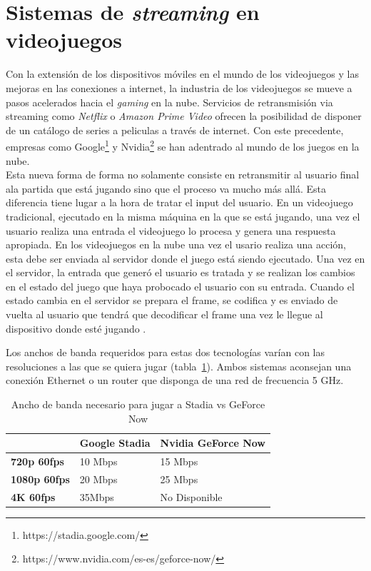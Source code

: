\section{Sistemas de \textit{streaming} en videojuegos}

Con la extensi\'on de los dispositivos m\'oviles en el mundo de los videojuegos y las mejoras en las conexiones a internet, la industria de los videojuegos se mueve a pasos acelerados hacia el \textit{gaming} en la nube. Servicios de retransmisi\'on via streaming como \textit{Netflix} o \textit{Amazon Prime Video} ofrecen la posibilidad de disponer de un cat\'alogo de series a peliculas a trav\'es de internet. Con este precedente, empresas como Google\footnote{https://stadia.google.com/} y Nvidia\footnote{https://www.nvidia.com/es-es/geforce-now/} se han adentrado al mundo de los juegos en la nube.\\

Esta nueva forma de forma no solamente consiste en retransmitir al usuario final ala partida que est\'a jugando sino que el proceso va mucho m\'as all\'a. Esta diferencia tiene lugar a la hora de tratar el input del usuario. En un videojuego tradicional, ejecutado en la misma m\'aquina en la que se est\'a jugando, una vez el usuario realiza una entrada el videojuego lo procesa y genera una respuesta apropiada. En los videojuegos en la nube una vez el usario realiza una acci\'on, esta debe ser enviada al servidor donde el juego est\'a siendo ejecutado. Una vez en el servidor, la entrada que gener\'o el usuario es tratada y se realizan los cambios en el estado del juego que haya probocado el usuario con su entrada. Cuando el estado cambia en el servidor se prepara el frame, se codifica y es enviado de vuelta al usuario que tendr\'a que decodificar el frame una vez le llegue al dispositivo donde est\'e jugando \citep{cloudgaming}.

Los anchos de banda requeridos para estas dos tecnolog\'ias var\'ian con las resoluciones a las que se quiera jugar (tabla~\ref{stadiovsgeforce}). Ambos sistemas aconsejan una conexi\'on Ethernet o un router que disponga de una red de frecuencia 5 GHz.

\begin{table}[h]
    \begin{tabular}{lll}
        \toprule
         & \textbf{Google Stadia} & \textbf{Nvidia GeForce Now} \\
        \midrule
        \textbf{720p 60fps} & 10 Mbps & 15 Mbps\\
        \textbf{1080p 60fps} & 20 Mbps & 25 Mbps \\
		\textbf{4K 60fps} & 35Mbps & No Disponible \\
        \bottomrule
    \end{tabular}
\caption{Ancho de banda necesario para jugar a Stadia vs GeForce Now}
\label{stadiovsgeforce}
\end{table}



